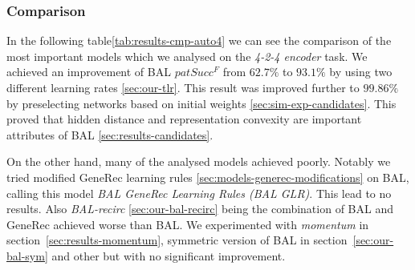 
\subsubsection{Comparison} 
\label{sec:tlr-auto4-cmp} 

In the following table\ref{tab:results-cmp-auto4} we can see the comparison of the most important models which we analysed on the \emph{4-2-4 encoder} task. We achieved an improvement of BAL $patSucc^F$ from $62.7\%$ to $93.1\%$ by using two different learning rates \ref{sec:our-tlr}. This result was improved further to $99.86\%$ by preselecting networks based on initial weights \ref{sec:sim-exp-candidates}. This proved that hidden distance and representation convexity are important attributes of BAL \ref{sec:results-candidates}. 

On the other hand, many of the analysed models achieved poorly. Notably we tried modified GeneRec learning rules \ref{sec:models-generec-modifications} on BAL, calling this model \emph{BAL GeneRec Learning Rules (BAL GLR)}. This lead to no results. Also \emph{BAL-recirc} \ref{sec:our-bal-recirc} being the combination of BAL and GeneRec achieved worse than BAL. We experimented with \emph{momentum} in section~\ref{sec:results-momentum}, symmetric version of BAL in section~\ref{sec:our-bal-sym} and other but with no significant improvement. 

